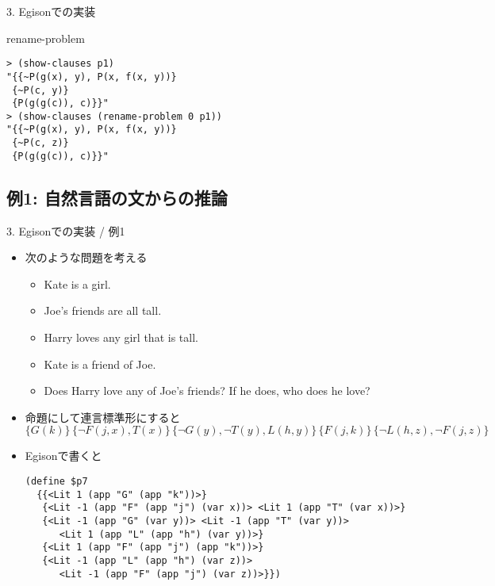 \documentclass[dvipdfmx,11pt,notheorems]{beamer}
\theoremstyle{definition}
\begin{document}
\begin{frame}[fragile]{3. Egisonでの実装}
  \begin{exampleblock}{rename-problem}
    \begin{verbatim}
> (show-clauses p1)
"{{~P(g(x), y), P(x, f(x, y))}
 {~P(c, y)}
 {P(g(g(c)), c)}}"
> (show-clauses (rename-problem 0 p1))
"{{~P(g(x), y), P(x, f(x, y))}
 {~P(c, z)}
 {P(g(g(c)), c)}}"
    \end{verbatim}
  \end{exampleblock}
\end{frame}

\subsection{例1: 自然言語の文からの推論}
\begin{frame}[fragile]{3. Egisonでの実装 / 例1}
  \begin{itemize}
    \item 次のような問題を考える
    \begin{itemize}
      \item Kate is a girl.
      \item Joe's friends are all tall.
      \item Harry loves any girl that is tall.
      \item Kate is a friend of Joe.
      \item Does Harry love any of Joe's friends? If he does, who does he love?
    \end{itemize}
    \item 命題にして連言標準形にすると
    \vspace{-5pt}
    \[
    \{G(k)\} \, \{\lnot F(j, x), T(x)\} \, \{\lnot G(y), \lnot T(y), L(h, y)\} \, \{F(j, k)\} \, \{\lnot L(h, z), \lnot F(j, z)\}
    \]
    \item Egisonで書くと
    \begin{verbatim}
(define $p7
  {{<Lit 1 (app "G" (app "k"))>}
   {<Lit -1 (app "F" (app "j") (var x))> <Lit 1 (app "T" (var x))>}
   {<Lit -1 (app "G" (var y))> <Lit -1 (app "T" (var y))>
      <Lit 1 (app "L" (app "h") (var y))>}
   {<Lit 1 (app "F" (app "j") (app "k"))>}
   {<Lit -1 (app "L" (app "h") (var z))>
      <Lit -1 (app "F" (app "j") (var z))>}})
    \end{verbatim}
  \end{itemize}
\end{frame}
\end{document}
